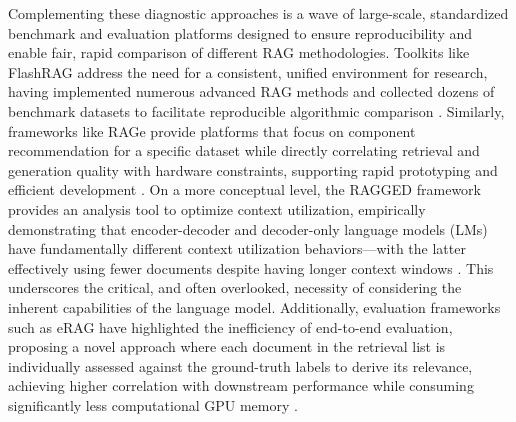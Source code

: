 \documentclass[11pt,a4paper]{article}
\begin{document}
Complementing these diagnostic approaches is a wave of large-scale, standardized benchmark and evaluation platforms designed to ensure reproducibility and enable fair, rapid comparison of different RAG methodologies. Toolkits like FlashRAG address the need for a consistent, unified environment for research, having implemented numerous advanced RAG methods and collected dozens of benchmark datasets to facilitate reproducible algorithmic comparison \cite{arxiv:2405.13576v1}. Similarly, frameworks like RAGe provide platforms that focus on component recommendation for a specific dataset while directly correlating retrieval and generation quality with hardware constraints, supporting rapid prototyping and efficient development \cite{arxiv:2605.27445v1}. On a more conceptual level, the RAGGED framework provides an analysis tool to optimize context utilization, empirically demonstrating that encoder-decoder and decoder-only language models (LMs) have fundamentally different context utilization behaviors---with the latter effectively using fewer documents despite having longer context windows \cite{arxiv:2403.09040v1}. This underscores the critical, and often overlooked, necessity of considering the inherent capabilities of the language model. Additionally, evaluation frameworks such as eRAG have highlighted the inefficiency of end-to-end evaluation, proposing a novel approach where each document in the retrieval list is individually assessed against the ground-truth labels to derive its relevance, achieving higher correlation with downstream performance while consuming significantly less computational GPU memory \cite{arxiv:2404.13781v1}.
\end{document}

